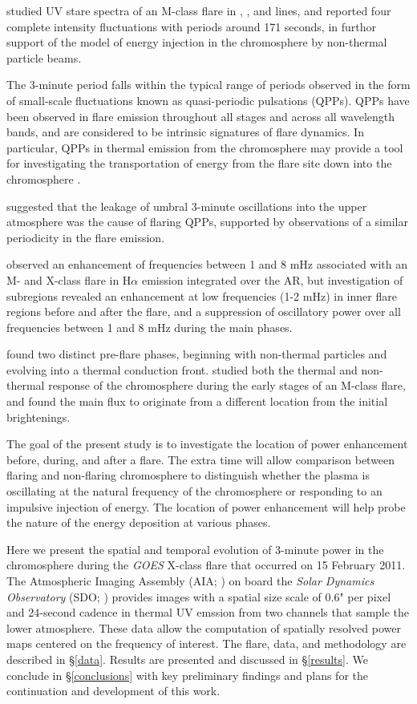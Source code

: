 \cite{Brosius2015} studied UV stare spectra of an M-class flare
in , , and  lines,
and reported four complete intensity fluctuations with periods
around 171 seconds, in furthor support of the
model of energy injection in the chromosphere by non-thermal particle beams.



The 3-minute period falls within the typical range of periods observed
in the form of
small-scale fluctuations known as quasi-periodic pulsations (QPPs).
QPPs have been observed in flare emission throughout all stages
and across all wavelength bands, and are considered to be intrinsic signatures of
flare dynamics.
In particular, QPPs in thermal emission from the chromosphere
may provide a tool for investigating the transportation of energy from
the flare site down into the chromosphere
\citep{Inglis2015}.


\cite{Sych2009} suggested that the leakage of umbral 3-minute oscillations
into the upper atmosphere was the cause of flaring QPPs, supported by
observations of a similar periodicity in the flare emission.


\cite{Monsue2016} observed
an enhancement of frequencies
between 1 and 8 mHz
associated with an M- and X-class flare
in H$\alpha$ emission integrated over the AR,
but investigation of subregions revealed an
enhancement at low frequencies (1-2 mHz) in inner flare regions
before and after the flare, and a
suppression of oscillatory power over all frequencies
between 1 and 8 mHz during the main phases.

\cite{Awasthi2018} found two distinct pre-flare phases,
beginning with non-thermal particles and evolving into a
thermal conduction front.
\cite{Fletcher2013b} studied both the thermal and non-thermal response
of the chromosphere during the early stages of an M-class flare,
and found the main flux to originate from a different location from
the initial brightenings.

The goal of the present study is to
investigate the location of power enhancement
before, during, and after a flare.
The extra time will allow comparison between flaring and non-flaring chromosphere
to distinguish whether the
plasma is oscillating at the natural frequency of the chromosphere
or responding to an impulsive injection of energy.
The location of power enhancement will help
probe the nature of the energy deposition at various phases.

Here we present the spatial and temporal evolution of 3-minute power in the
chromosphere during the
\textit{GOES} X-class flare that occurred on 15 February 2011.
The Atmospheric Imaging Assembly (AIA; \cite{Lemen2012}) on board the
\textit{Solar Dynamics Observatory} (SDO; \cite{Pesnell2012})
provides images
with a spatial size scale of 0.6" per pixel and 24-second cadence
in thermal UV emssion from
two channels that sample the lower atmosphere.
These data allow the computation of spatially resolved power maps centered
on the frequency of interest.
The flare, data, and methodology are described in \S\ref{data}.
Results are presented and discussed in \S\ref{results}.
We conclude in \S\ref{conclusions}
with key preliminary findings and plans for the continuation and
development of this work.
